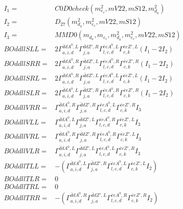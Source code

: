 \documentclass[A4,landscape]{article}
\begin{document}
\begin{align} 
I_1 = & C0D0check(m^2_{e_{{c}}}, mV22, mS12, m^2_{d_{{a}}}) \\ 
I_2 = & D_{27}(m^2_{d_{{a}}}, m^2_{e_{{c}}}, mV22, mS12) \\ 
I_3 = & MMD0(m_{d_{{a}}}, m_{e_{{c}}}, m^2_{d_{{a}}}, m^2_{e_{{c}}}, mV22, mS12) \\ 
  BOddllSLL= & 2  \Gamma^{\bar{d}d A^0 ,L}_{a, i, d} \Gamma^{\bar{d}d {Z'} ,R}_{j, a} \Gamma^{\bar{e}e A^0 ,L}_{l, c, d} \Gamma^{\bar{e}e {Z'} ,L}_{c, k} (I_1 - 2 I_2) \\ 
  BOddllSRR= & 2  \Gamma^{\bar{d}d A^0 ,R}_{a, i, d} \Gamma^{\bar{d}d {Z'} ,L}_{j, a} \Gamma^{\bar{e}e A^0 ,R}_{l, c, d} \Gamma^{\bar{e}e {Z'} ,R}_{c, k} (I_1 - 2 I_2) \\ 
  BOddllSRL= & 2  \Gamma^{\bar{d}d A^0 ,R}_{a, i, d} \Gamma^{\bar{d}d {Z'} ,L}_{j, a} \Gamma^{\bar{e}e A^0 ,L}_{l, c, d} \Gamma^{\bar{e}e {Z'} ,L}_{c, k} (I_1 - 2 I_2) \\ 
  BOddllSLR= & 2  \Gamma^{\bar{d}d A^0 ,L}_{a, i, d} \Gamma^{\bar{d}d {Z'} ,R}_{j, a} \Gamma^{\bar{e}e A^0 ,R}_{l, c, d} \Gamma^{\bar{e}e {Z'} ,R}_{c, k} (I_1 - 2 I_2) \\ 
  BOddllVRR= &  \Gamma^{\bar{d}d A^0 ,R}_{a, i, d} \Gamma^{\bar{d}d {Z'} ,R}_{j, a} \Gamma^{\bar{e}e A^0 ,L}_{l, c, d} \Gamma^{\bar{e}e {Z'} ,R}_{c, k} I_3 \\ 
  BOddllVLL= &  \Gamma^{\bar{d}d A^0 ,L}_{a, i, d} \Gamma^{\bar{d}d {Z'} ,L}_{j, a} \Gamma^{\bar{e}e A^0 ,R}_{l, c, d} \Gamma^{\bar{e}e {Z'} ,L}_{c, k} I_3 \\ 
  BOddllVRL= &  \Gamma^{\bar{d}d A^0 ,R}_{a, i, d} \Gamma^{\bar{d}d {Z'} ,R}_{j, a} \Gamma^{\bar{e}e A^0 ,R}_{l, c, d} \Gamma^{\bar{e}e {Z'} ,L}_{c, k} I_3 \\ 
  BOddllVLR= &  \Gamma^{\bar{d}d A^0 ,L}_{a, i, d} \Gamma^{\bar{d}d {Z'} ,L}_{j, a} \Gamma^{\bar{e}e A^0 ,L}_{l, c, d} \Gamma^{\bar{e}e {Z'} ,R}_{c, k} I_3 \\ 
  BOddllTLL= & -( \Gamma^{\bar{d}d A^0 ,L}_{a, i, d} \Gamma^{\bar{d}d {Z'} ,R}_{j, a} \Gamma^{\bar{e}e A^0 ,L}_{l, c, d} \Gamma^{\bar{e}e {Z'} ,L}_{c, k} I_2) \\ 
  BOddllTLR= & 0 \\ 
  BOddllTRL= & 0 \\ 
  BOddllTRR= & -( \Gamma^{\bar{d}d A^0 ,R}_{a, i, d} \Gamma^{\bar{d}d {Z'} ,L}_{j, a} \Gamma^{\bar{e}e A^0 ,R}_{l, c, d} \Gamma^{\bar{e}e {Z'} ,R}_{c, k} I_2) \\ 
\end{align} 
\end{document}
